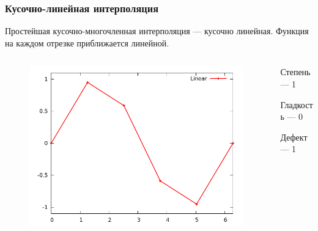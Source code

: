 \documentclass[aspectratio=169,unicode]{beamer}
\begin{document}
\begin{frame}
\frametitle{Кусочно-линейная интерполяция}
	Простейшая кусочно-многочленная интерполяция --- кусочно линейная.
	Функция на каждом отрезке приближается линейной.

	\begin{columns}[c]
	\begin{column}{0.6\textwidth}
	\begin{figure}
	\center
	\includegraphics[height=.7\textheight]{spline1_1.png}%
	\end{figure}
	\end{column}
	\begin{column}{0.4\textwidth}
	Степень --- 1

	Гладкость --- 0

	Дефект --- 1
	\end{column}
	\end{columns}
\end{frame}
\end{document}
